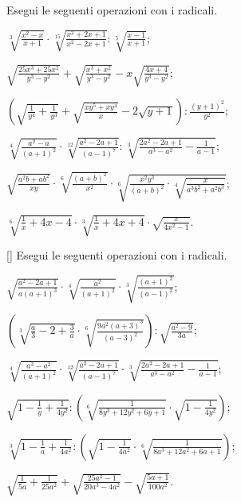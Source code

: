 \begin{esercizio}[\Ast]
 \label{ese:2.64}
Esegui le seguenti operazioni con i radicali.
 \begin{enumeratea}
 \item $\sqrt[3]{\frac{x^2-x}{x+1}}\cdot \sqrt[15]{\frac{x^2+2x+1}{x^2-2x+1}}:\sqrt[5]{\frac{x-1}{x+1}}$;
 \item $\sqrt{\frac{25x^3+25x^2}{y^3-y^2}}+\sqrt{\frac{x^3+x^2}{y^3-y^2}}-x\sqrt{\frac{4x+4}{y^3-y^2}}$;
 \item $\left(\sqrt{\frac 1{y^4}+\frac 1{y^3}}+\sqrt{\frac{xy^5+xy^4} x}-2\sqrt{y+1}\right):\frac{(y+1)^2}{y^2}$;
 \item $\sqrt[4]{\frac{a^2-a}{(a+1)^2}}\cdot \sqrt[12]{\frac{a^2-2a+1}{(a-1)^7}}:\sqrt[3]{\frac{2a^2-2a+1}{a^3-a^2}-\frac 1{a-1}}$;
 \item $\sqrt{\frac{a^2b+ab^2}{xy}}\cdot \sqrt[6]{\frac{(a+b)^2}{x^2}}\cdot \sqrt[6]{\frac{x^2y^3}{(a+b)^2}\cdot \sqrt[4]{\frac x{a^3b^2+a^2b^3}}}$;
 \item $\sqrt[6]{\frac 1 x+4x-4}\cdot \sqrt[3]{\frac 1 x+4x+4}\cdot \sqrt{\frac x{4x^2-1}}$.
 \end{enumeratea}
\end{esercizio}

\begin{esercizio}
 \label{ese:2.65}[\Ast]
Esegui le seguenti operazioni con i radicali.
 \begin{enumeratea}
 \item $\sqrt{\frac{a^2-2a+1}{a(a+1)^3}}\cdot \sqrt[4]{\frac{a^2}{(a+1)^2}}\cdot \sqrt[3]{\frac{(a+1)^2}{(a-1)^2}}$;
 \item $\left(\sqrt[3]{\frac a 3-2+\frac 3 a}\cdot \sqrt[6]{\frac{9a^2(a+3)^3}{(a-3)^2}}\right):\sqrt{\frac{a^2-9}{3a}}$;
 \item $\sqrt[4]{\frac{a^3-a^2}{(a+1)^2}}\cdot \sqrt[12]{\frac{a^2-2a+1}{(a-1)^7}}\cdot \sqrt[3]{\frac{2a^2-2a+1}{a^3-a^2}-\frac 1{a-1}}$;
 \item $\sqrt{1-\frac 1 y+\frac 1{4y^2}}:\left(\sqrt[6]{\frac 1{8y^3+12y^2+6y+1}}\cdot \sqrt{1-\frac 1{4y^2}}\right)$;
 \item $\sqrt[3]{1-\frac 1 a+\frac 1{4a^2}}:\left(\sqrt{1-\frac 1{4a^2}}\cdot \sqrt[6]{\frac 1{8a^3+12a^2+6a+1}}\right)$;
 \item $\sqrt{\frac 1{5a}+\frac 1{25a^2}}+\sqrt{\frac{25a^2-1}{20a^3-4a^2}}-\sqrt{\frac{5a+1}{100a^2}}$.
 \end{enumeratea}
\end{esercizio}

